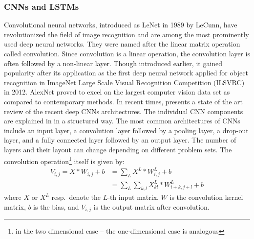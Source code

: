 \documentclass{ieeeaccess}
\begin{document}
\subsubsection{CNNs and LSTMs }
Convolutional neural networks, introduced as LeNet in 1989 by LeCunn, have revolutionized the field of image recognition and are among the most prominently used deep neural networks. They were named after the linear matrix operation called convolution. Since convolution is a linear operation, the convolution layer is often followed by a non-linear layer. Though introduced earlier, it gained popularity after its application as the first deep neural network applied for object recognition in ImageNet Large Scale Visual Recognition Competition (ILSVRC) in 2012. AlexNet proved to excel on the largest computer vision data set as compared to contemporary methods. In recent times, \cite{cite-key1} presents a state of the art review of the recent deep CNNs architectures. The individual CNN components are explained in \cite{8308186} in a structured way.
The most common architectures of CNNs include an input layer, a convolution layer followed by a pooling layer, a drop-out layer, and a fully connected layer followed by an output layer. The number of layers and their layout can change depending on different problem sets. The convolution operation\footnote{in the two dimensional case -- the one-dimensional case is analogous} itself is given by:
\begin{align*}
V_{i,j}= X*W_{i,j}+b    &= \sum_{L}X^L*W^L_{i,j}+b \\
                        &=  \sum_{L}\sum_{k,l} X^L_{kl}*W^L_{i+k,j+l}+b
\end{align*}
where $X$ or $X^L$ resp.\ denote the $L$-th input matrix. $W$ is the convolution kernel matrix, $b$ is the bias, and $V_{i,j}$ is the output matrix after convolution. %
\end{document}
